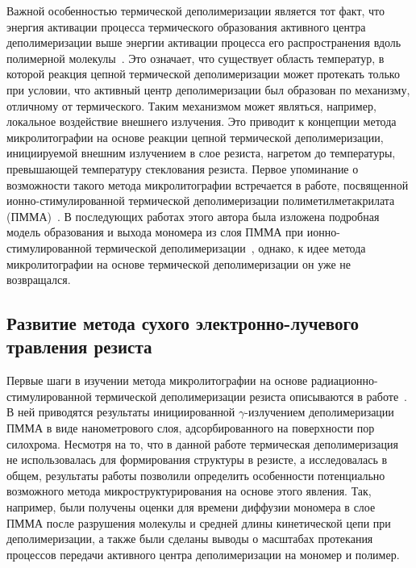Важной особенностью термической деполимеризации является тот факт, что энергия активации процесса термического образования активного центра деполимеризации выше энергии активации процесса его распространения вдоль полимерной молекулы~\cite{Cowley_1952_1, Sanchez-Jimenez_Ea}.
Это означает, что существует область температур, в которой реакция цепной термической деполимеризации может протекать только при условии, что активный центр деполимеризации был образован по механизму, отличному от термического.
Таким механизмом может являться, например, локальное воздействие внешнего излучения.
Это приводит к концепции метода микролитографии на основе реакции цепной термической деполимеризации, инициируемой внешним излучением в слое резиста, нагретом до температуры, превышающей температуру стеклования резиста.
Первое упоминание о возможности такого метода микролитографии встречается в работе, посвященной ионно-стимулированной термической деполимеризации полиметилметакрилата \linebreak (ПММА)~\cite{Fragala_1}.
В последующих работах этого автора была изложена подробная модель образования и выхода мономера из слоя \linebreak ПММА при ионно-стимулированной термической деполимеризации~\cite{Fragala_2,Fragala_3_diffusion}, \linebreak однако, к идее метода микролитографии на основе термической деполимеризации он уже не возвращался.


\subsection{Развитие метода сухого электронно-лучевого травления резиста}
Первые шаги в изучении метода микролитографии на основе радиационно-стимулированной термической деполимеризации резиста описываются в работе~\cite{Bruk_2000}. В ней приводятся результаты инициированной $\gamma$-излучением деполимеризации ПММА в виде нанометрового слоя, адсорбированного на поверхности пор силохрома. Несмотря на то, что в данной работе термическая деполимеризация не использовалась для формирования структуры в резисте, а исследовалась в общем, результаты работы позволили определить особенности потенциально возможного метода микроструктурирования на основе этого явления. Так, например, были получены оценки для времени диффузии мономера в слое ПММА после разрушения молекулы и средней длины кинетической цепи при деполимеризации, а также были сделаны выводы о масштабах протекания процессов передачи активного центра деполимеризации на мономер и полимер.

